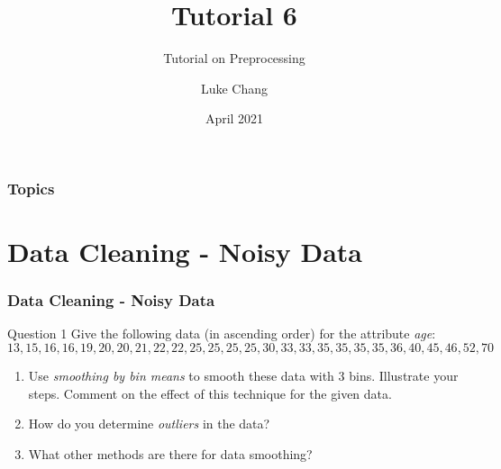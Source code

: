 \documentclass[aspectratio=169, 10pt]{beamer}
\title{Tutorial 6}
\subtitle{Tutorial on Preprocessing}
\author{Luke Chang}
\institute{The University of Auckland}
\date{April 2021}
\begin{document}
\frame{\titlepage}

\begin{frame}
    \frametitle{Topics}

    \tableofcontents
        
\end{frame}

\section{Data Cleaning - Noisy Data}
\begin{frame}[t]
    \frametitle{Data Cleaning - Noisy Data}

    \begin{block}{Question 1}
        Give the following data (in ascending order) for the attribute \textit{age}: 
        \[13,15,16,16,19,20,20,21,22,22,25,25,25,25,30,33,33,35,35,35,35,36,40,45,46,52,70\]
    \end{block}

    \begin{enumerate}
        \item Use \textit{smoothing by bin means} to smooth these data with 3 bins. 
        Illustrate your steps. Comment on the effect of this technique for the given data.
        \item How do you determine \textit{outliers} in the data?
        \item What other methods are there for data smoothing?
    \end{enumerate}

\end{frame}
\end{document}
